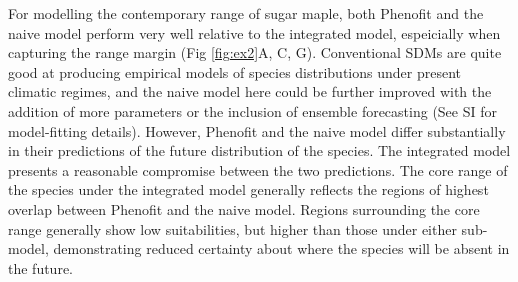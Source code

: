 For modelling the contemporary range of sugar maple, both Phenofit and the naive model perform very well relative to the integrated model, espeicially when capturing the range margin (Fig \ref{fig:ex2}A, C, G).
Conventional SDMs are quite good at producing empirical models of species distributions under present climatic regimes, and the naive model here could be further improved with the addition of more parameters or the inclusion of ensemble forecasting (See SI for model-fitting details).
However, Phenofit and the naive model differ substantially in their predictions of the future distribution of the species.
The integrated model presents a reasonable compromise between the two predictions. 
The core range of the species under the integrated model generally reflects the regions of highest overlap between Phenofit and the naive model.
Regions surrounding the core range generally show low suitabilities, but higher than those under either sub-model, demonstrating reduced certainty about where the species will be absent in the future.



